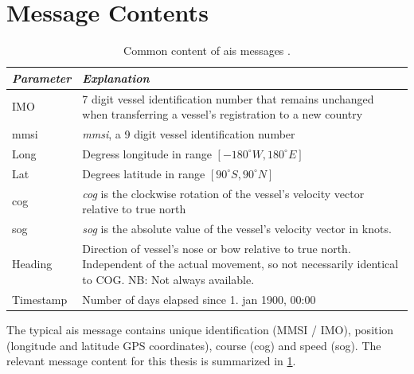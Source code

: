 \section{Message Contents}
\begin{table}[h]
    \centering
    \begin{tabular}{p{}  p{}}
        \textit{\textbf{Parameter}} & \textit{\textbf{Explanation}}                                                                                                     \\ \hline
        IMO                         & 7 digit vessel identification number that remains unchanged when transferring a vessel's registration to a new country            \\
        \acrshort{mmsi}                        & \textit{\acrfull{mmsi}}, a 9 digit vessel identification number                                                          \\
        Long                        & Degress longitude in range $[-180^\circ W, 180^\circ E]$                                                                          \\
        Lat                         & Degrees latitude in range $[90^\circ S, 90^\circ N]$                                                                             \\
        \acrshort{cog}                         & \textit{\acrfull{cog}} is the clockwise rotation of the vessel's velocity vector relative to true north                               \\
        \acrshort{sog}                         & \textit{\acrfull{sog}} is the absolute value of the vessel's velocity vector in knots.                                               \\
        Heading                     & Direction of vessel's nose or bow relative to true north. Independent of the actual movement, so not necessarily identical to COG. NB: Not always available. \\
        Timestamp                   & Number of days elapsed since 1. jan 1900, 00:00                                                                                   \\ \hline
    \end{tabular}
    \caption{Common content of \acrshort{ais} messages \cite{hexeberg}.}
    \label{table:ais_content}
\end{table}
The typical \acrshort{ais} message contains unique identification (MMSI / IMO), position (longitude and latitude GPS coordinates), course (\acrshort{cog}) and speed (\acrshort{sog}). The relevant message content for this thesis is summarized in \cref{table:ais_content}.

